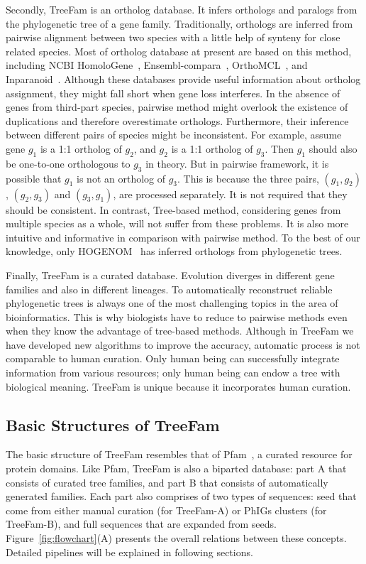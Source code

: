 Secondly, TreeFam is an ortholog database. It infers orthologs and paralogs from
the phylogenetic tree of a gene family. Traditionally, orthologs are inferred from
pairwise alignment between two species with a little help of synteny for close related species. Most of ortholog database at present are
based on this method, including NCBI HomoloGene~\cite{wheeler05},
Ensembl-compara~\cite{hubbard05}, OrthoMCL~\cite{li03}, and Inparanoid~\cite{o'brien05}.
Although these databases provide useful information about ortholog assignment,
they might fall short when gene loss interferes. In the absence of
genes from third-part species, pairwise method might overlook the existence
of duplications and therefore overestimate orthologs.
Furthermore, their inference between different pairs of species might be inconsistent.
For example, assume gene $g_1$ is a 1:1 ortholog of $g_2$, and $g_2$ is a 1:1 ortholog of $g_3$. Then
$g_1$ should also be one-to-one orthologous to $g_3$ in theory. But in pairwise framework, it is possible
that $g_1$ is not an ortholog of $g_3$. This is because the three pairs, $(g_1,g_2)$, $(g_2,g_3)$
and $(g_3,g_1)$, are processed separately. It is not required that they should be consistent.
In contrast, Tree-based method, considering genes from multiple species as a whole, will not suffer from these problems.
It is also more intuitive and informative in comparison with pairwise method.
To the best of our knowledge, only HOGENOM~\cite{dufayard05} has inferred orthologs from
phylogenetic trees.

Finally, TreeFam is a curated database. Evolution diverges in different gene families
and also in different lineages. To automatically reconstruct reliable phylogenetic trees is always
one of the most challenging topics in the area of bioinformatics. This is why biologists have to reduce to
pairwise methods even when they know the advantage of tree-based methods. Although in TreeFam we have developed new algorithms to improve
the accuracy, automatic process is not comparable to human curation. Only
human being can successfully integrate information from various resources;
only human being can endow a tree with biological meaning. TreeFam is unique because
it incorporates human curation.

\subsection{Basic Structures of TreeFam}
The basic structure of TreeFam resembles that of Pfam~\cite{bateman04}, a curated resource for
protein domains. Like Pfam, TreeFam is also a biparted database: part A
that consists of curated tree families, and part B that consists of automatically
generated families. Each part also comprises of two types of sequences:
seed that come from either manual curation (for TreeFam-A) or PhIGs clusters (for TreeFam-B),
and full sequences that are expanded from seeds. Figure~\ref{fig:flowchart}(A) presents the overall
relations between these concepts. Detailed pipelines will be explained in
following sections.


